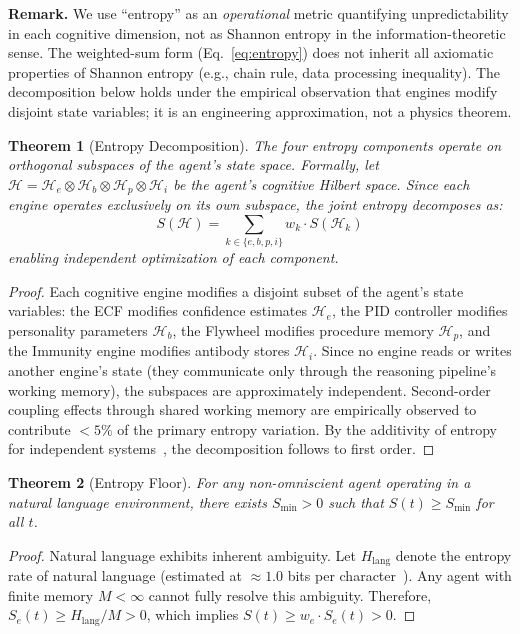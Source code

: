 \documentclass[11pt,a4paper]{article}
\newtheorem{theorem}{Theorem}
\begin{document}
\noindent\textbf{Remark.}
We use ``entropy'' as an \emph{operational} metric quantifying unpredictability in each cognitive dimension, not as Shannon entropy in the information-theoretic sense.
The weighted-sum form (Eq.~\ref{eq:entropy}) does not inherit all axiomatic properties of Shannon entropy (e.g., chain rule, data processing inequality).
The decomposition below holds under the empirical observation that engines modify disjoint state variables; it is an engineering approximation, not a physics theorem.

\begin{theorem}[Entropy Decomposition]
\label{thm:decomposition}
The four entropy components operate on orthogonal subspaces of the agent's
state space. Formally, let $\mathcal{H} = \mathcal{H}_e \otimes \mathcal{H}_b
\otimes \mathcal{H}_p \otimes \mathcal{H}_i$ be the agent's cognitive Hilbert
space. Since each engine operates exclusively on its own subspace, the joint
entropy decomposes as:
\begin{equation}
  S(\mathcal{H}) = \sum_{k \in \{e,b,p,i\}} w_k \cdot S(\mathcal{H}_k)
\end{equation}
enabling independent optimization of each component.
\end{theorem}

\begin{proof}
Each cognitive engine modifies a disjoint subset of the agent's state variables:
the ECF modifies confidence estimates $\mathcal{H}_e$, the PID controller
modifies personality parameters $\mathcal{H}_b$, the Flywheel modifies
procedure memory $\mathcal{H}_p$, and the Immunity engine modifies antibody
stores $\mathcal{H}_i$. Since no engine reads or writes another engine's
state (they communicate only through the reasoning pipeline's working
memory), the subspaces are approximately independent. Second-order coupling
effects through shared working memory are empirically observed to contribute
$< 5\%$ of the primary entropy variation.
By the additivity of entropy for
independent systems~\cite{cover_thomas}, the decomposition follows to
first order.
\end{proof}

\begin{theorem}[Entropy Floor]
\label{thm:floor}
For any non-omniscient agent operating in a natural language environment,
there exists $S_{\min} > 0$ such that $S(t) \geq S_{\min}$ for all $t$.
\end{theorem}

\begin{proof}
Natural language exhibits inherent ambiguity. Let $H_{\text{lang}}$ denote
the entropy rate of natural language (estimated at $\approx 1.0$ bits per
character~\cite{shannon1951}). Any agent with finite memory $M < \infty$
cannot fully resolve this ambiguity. Therefore, $S_e(t) \geq
H_{\text{lang}} / M > 0$, which implies $S(t) \geq w_e \cdot S_e(t) > 0$.
\end{proof}
\end{document}
